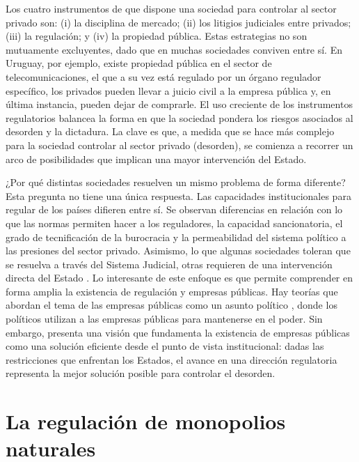 \documentclass[
  12pt,
  spanish,
]{book}
\begin{document}
Los cuatro instrumentos de que dispone una sociedad para controlar al sector privado son: (i) la disciplina de mercado; (ii) los litigios judiciales entre privados; (iii) la regulación; y (iv) la propiedad pública. Estas estrategias no son mutuamente excluyentes, dado que en muchas sociedades conviven entre sí. En Uruguay, por ejemplo, existe propiedad pública en el sector de telecomunicaciones, el que a su vez está regulado por un órgano regulador específico, los privados pueden llevar a juicio civil a la empresa pública y, en última instancia, pueden dejar de comprarle. El uso creciente de los instrumentos regulatorios balancea la forma en que la sociedad pondera los riesgos asociados al desorden y la dictadura. La clave es que, a medida que se hace más complejo para la sociedad controlar al sector privado (desorden), se comienza a recorrer un arco de posibilidades que implican una mayor intervención del Estado.

¿Por qué distintas sociedades resuelven un mismo problema de forma diferente? Esta pregunta no tiene una única respuesta. Las capacidades institucionales para regular de los países difieren entre sí. Se observan diferencias en relación con lo que las normas permiten hacer a los reguladores, la capacidad sancionatoria, el grado de tecnificación de la burocracia y la permeabilidad del sistema político a las presiones del sector privado. Asimismo, lo que algunas sociedades toleran que se resuelva a través del Sistema Judicial, otras requieren de una intervención directa del Estado \citep{Alesina2005}. Lo interesante de este enfoque es que permite comprender en forma amplia la existencia de regulación y empresas públicas. Hay teorías que abordan el tema de las empresas públicas como un asunto político \citep{Shleifer1994}, donde los políticos utilizan a las empresas públicas para mantenerse en el poder. Sin embargo, \citet{Shleifer2005} presenta una visión que fundamenta la existencia de empresas públicas como una solución eficiente desde el punto de vista institucional: dadas las restricciones que enfrentan los Estados, el avance en una dirección regulatoria representa la mejor solución posible para controlar el desorden.

\hypertarget{la-regulaciuxf3n-de-monopolios-naturales}{%
\section{La regulación de monopolios naturales}\label{la-regulaciuxf3n-de-monopolios-naturales}}
\end{document}
